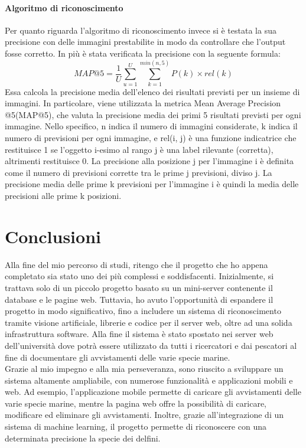 \documentclass[a4paper,final,12pt]{report}
\begin{document}
\subsubsection{Algoritmo di riconoscimento}
Per quanto riguarda l'algoritmo di riconoscimento invece si è testata la sua precisione con delle immagini prestabilite in modo da controllare che l'output fosse corretto.
In più è stata verificata la precisione con la seguente formula:
\begin{equation}
MAP@5 = \frac{1}{U} \sum_{u=1}^{U} \sum_{k=1}^{min(n,5)} P(k) \times rel(k)
\end{equation}
Essa calcola la precisione media dell'elenco dei risultati previsti per un insieme di immagini. In particolare, viene utilizzata la metrica Mean Average Precision @5(MAP@5), che valuta la precisione media dei primi 5 risultati previsti per ogni immagine.
Nello specifico, n indica il numero di immagini considerate, k indica il numero di previsioni per ogni immagine, e rel(i, j) è una funzione indicatrice che restituisce 1 se l'oggetto i-esimo al rango j è una label rilevante (corretta), altrimenti restituisce 0.
La precisione alla posizione j per l'immagine i è definita come il numero di previsioni corrette tra le prime j previsioni, diviso j. La precisione media delle prime k previsioni per l'immagine i è quindi la media delle precisioni alle prime k posizioni.

\chapter{Conclusioni}
Alla fine del mio percorso di studi, ritengo che il progetto che ho appena completato sia stato uno dei più complessi e soddisfacenti. Inizialmente, si trattava solo di un piccolo progetto basato su un mini-server contenente il database e le pagine web. Tuttavia, ho avuto l'opportunità di espandere il progetto in modo significativo, fino a includere un sistema di riconoscimento tramite visione artificiale, librerie e codice per il server web, oltre ad una solida infrastruttura software. Alla fine il sistema è stato spostato nei server web dell'università dove potrà essere utilizzato da tutti i ricercatori e dai pescatori al fine di documentare gli avvistamenti delle varie specie marine.\\

Grazie al mio impegno e alla mia perseveranza, sono riuscito a sviluppare un sistema altamente ampliabile, con numerose funzionalità e applicazioni mobili e web. Ad esempio, l'applicazione mobile permette di caricare gli avvistamenti delle varie specie marine, mentre la pagina web offre la possibilità di caricare, modificare ed eliminare gli avvistamenti. Inoltre, grazie all'integrazione di un sistema di machine learning, il progetto permette di riconoscere con una determinata precisione la specie dei delfini.\\
\end{document}
